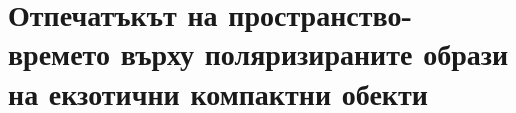 \section{Отпечатъкът на пространство-времето върху поляризираните образи на екзотични компактни обекти}
